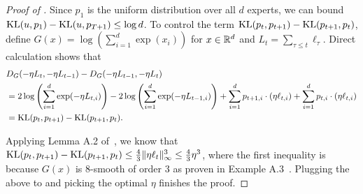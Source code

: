 \begin{proof}[Proof of ]
    Since $p_1$ is the uniform distribution over all $d$ experts, we can bound $\text{\rm KL}(u,p_1)-\text{\rm KL}(u,p_{T+1})\leq \log d$. To control the term $\text{\rm KL}(p_t,p_{t+1})- \text{\rm KL}(p_{t+1},p_t)$, define $G(x)=\log(\sum_{i=1}^d\exp(x_i))$ for $x\in\mathbb{R}^d$ and $L_t=\sum_{\tau\leq t}\ell_{\tau}$. Direct calculation shows that
    \begin{align*}
        &D_G(-\eta L_t, -\eta L_{t-1}) - D_G(-\eta L_{t-1}, -\eta L_{t}) \\
        &=2\log\left(\sum_{i=1}^d\exp(-\eta L_{t,i})\right) - 2\log\left(\sum_{i=1}^d\exp(-\eta L_{t-1,i})\right) + \sum_{i=1}^dp_{t+1,i}\cdot (\eta\ell_{t,i}) + \sum_{i=1}^dp_{t,i}\cdot(\eta\ell_{t,i}) \\
        &=\text{\rm KL}(p_t,p_{t+1})- \text{\rm KL}(p_{t+1},p_t).
    \end{align*}
    
    Applying Lemma A.2 of~\citet{wibisono2022alternating}, we know that $\text{\rm KL}(p_t,p_{t+1})- \text{\rm KL}(p_{t+1},p_t)\leq \frac{4}{3}\|\eta\ell_t\|_{\infty}^3\leq \frac{4}{3}\eta^3$, where the first inequality is because $G(x)$ is $8$-smooth of order 3 as proven in Example A.3~\citet{wibisono2022alternating}. Plugging the above to  and picking the optimal $\eta$ finishes the proof.
\end{proof}

